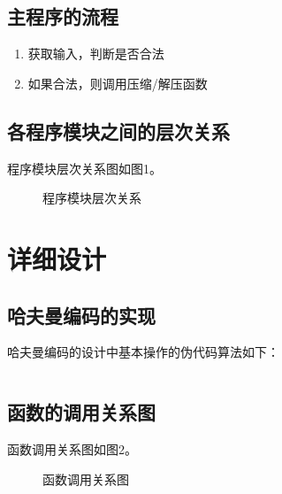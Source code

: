 \documentclass{article}
\begin{document}
\subsection{主程序的流程}

\begin{enumerate}
    \item 获取输入，判断是否合法
    \item 如果合法，则调用压缩/解压函数
\end{enumerate}

\subsection{各程序模块之间的层次关系}

程序模块层次关系图如图1。

\begin{figure}[htbp]


    \caption{程序模块层次关系}

\end{figure}

\section{详细设计}

\subsection{哈夫曼编码的实现}

哈夫曼编码的设计中基本操作的伪代码算法如下：

\begin{lstlisting}[language={C},
    numbers=left,
    numberstyle=\tiny\consolas,
    basicstyle=\small\consolas]
\end{lstlisting}

\subsection{函数的调用关系图}

函数调用关系图如图2。

\begin{figure}[htbp]


    \caption{函数调用关系图}

\end{figure}
\end{document}
